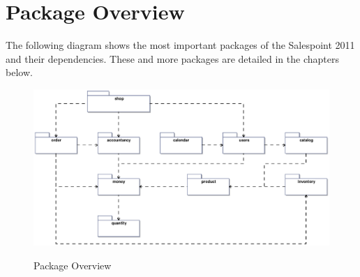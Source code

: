 \section{Package Overview}
The following diagram shows the most important packages of the Salespoint 2011 and their dependencies. These and more packages are detailed in the chapters below.

\begin{figure}[ht]
	\centering
  \includegraphics[scale =.72]{images/Overview_Package.eps}
	\label{package_overview}
	\caption{Package Overview}
\end{figure}